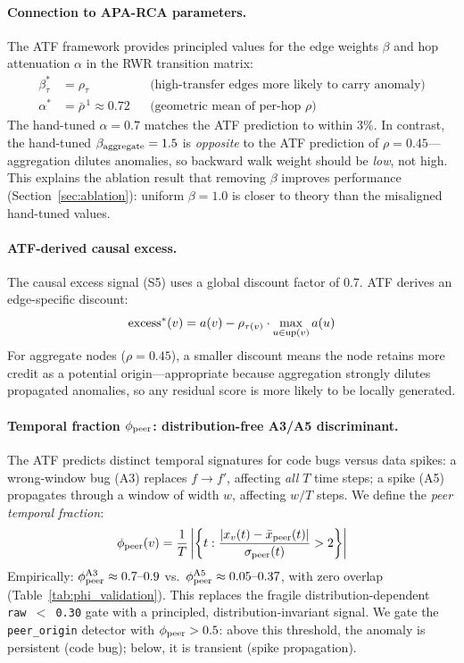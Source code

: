 \documentclass{article}
\begin{document}
\paragraph{Connection to APA-RCA parameters.}
The ATF framework provides principled values for the edge weights $\beta$
and hop attenuation $\alpha$ in the RWR transition matrix:
\begin{align}
  \beta^*_\tau &= \rho_\tau
    &&\text{(high-transfer edges more likely to carry anomaly)}
  \label{eq:beta_atf} \\
  \alpha^* &= \bar\rho^{\,1} \approx 0.72
    &&\text{(geometric mean of per-hop } \rho \text{)}
  \label{eq:alpha_atf}
\end{align}
The hand-tuned $\alpha = 0.7$ matches the ATF prediction to within 3\%.
In contrast, the hand-tuned $\beta_{\rm aggregate} = 1.5$ is
\emph{opposite} to the ATF prediction of $\rho = 0.45$---aggregation
dilutes anomalies, so backward walk weight should be \emph{low}, not high.
This explains the ablation result that removing $\beta$ improves
performance (Section~\ref{sec:ablation}): uniform $\beta = 1.0$ is closer
to theory than the misaligned hand-tuned values.

\paragraph{ATF-derived causal excess.}
The causal excess signal (S5) uses a global discount factor of 0.7.
ATF derives an edge-specific discount:
\begin{equation}
  {\rm excess}^*(v) = a(v) - \rho_{\tau(v)} \cdot \max_{u \in {\rm up}(v)} a(u)
  \label{eq:excess_atf}
\end{equation}
For aggregate nodes ($\rho = 0.45$), a smaller discount means
the node retains more credit as a potential origin---appropriate because
aggregation strongly dilutes propagated anomalies, so any residual score
is more likely to be locally generated.

\paragraph{Temporal fraction $\phi_{\rm peer}$: distribution-free A3/A5
discriminant.}
The ATF predicts distinct temporal signatures for code bugs versus data spikes:
a wrong-window bug (A3) replaces $f \to f'$, affecting \emph{all} $T$ time steps;
a spike (A5) propagates through a window of width $w$, affecting $w/T$ steps.
We define the \emph{peer temporal fraction}:
\begin{equation}
  \phi_{\rm peer}(v) = \frac{1}{T}\left|\left\{t : \frac{|x_v(t) - \bar{x}_{\rm peer}(t)|}{\sigma_{\rm peer}(t)} > 2\right\}\right|
  \label{eq:phi}
\end{equation}
Empirically: $\phi_{\rm peer}^{\rm A3} \approx 0.7\text{--}0.9$ vs.\
$\phi_{\rm peer}^{\rm A5} \approx 0.05\text{--}0.37$, with zero overlap
(Table~\ref{tab:phi_validation}).
This replaces the fragile distribution-dependent \texttt{raw\,$<$\,0.30}
gate with a principled, distribution-invariant signal.
We gate the \texttt{peer\_origin} detector with $\phi_{\rm peer} > 0.5$:
above this threshold, the anomaly is persistent (code bug); below,
it is transient (spike propagation).
\end{document}
